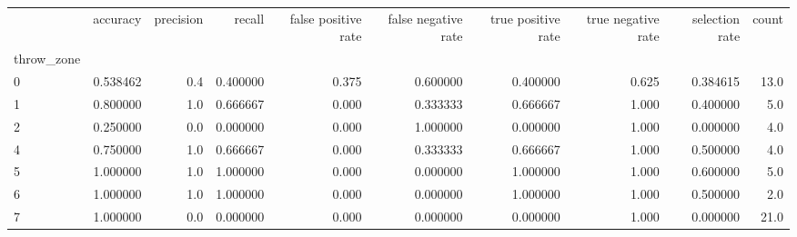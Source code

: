 \begin{tabular}{lrrrrrrrrr}
\toprule
{} &  accuracy &  precision &    recall &  false positive rate &  false negative rate &  true positive rate &  true negative rate &  selection rate &  count \\
throw\_zone &           &            &           &                      &                      &                     &                     &                 &        \\
\midrule
0          &  0.538462 &        0.4 &  0.400000 &                0.375 &             0.600000 &            0.400000 &               0.625 &        0.384615 &   13.0 \\
1          &  0.800000 &        1.0 &  0.666667 &                0.000 &             0.333333 &            0.666667 &               1.000 &        0.400000 &    5.0 \\
2          &  0.250000 &        0.0 &  0.000000 &                0.000 &             1.000000 &            0.000000 &               1.000 &        0.000000 &    4.0 \\
4          &  0.750000 &        1.0 &  0.666667 &                0.000 &             0.333333 &            0.666667 &               1.000 &        0.500000 &    4.0 \\
5          &  1.000000 &        1.0 &  1.000000 &                0.000 &             0.000000 &            1.000000 &               1.000 &        0.600000 &    5.0 \\
6          &  1.000000 &        1.0 &  1.000000 &                0.000 &             0.000000 &            1.000000 &               1.000 &        0.500000 &    2.0 \\
7          &  1.000000 &        0.0 &  0.000000 &                0.000 &             0.000000 &            0.000000 &               1.000 &        0.000000 &   21.0 \\
\bottomrule
\end{tabular}
